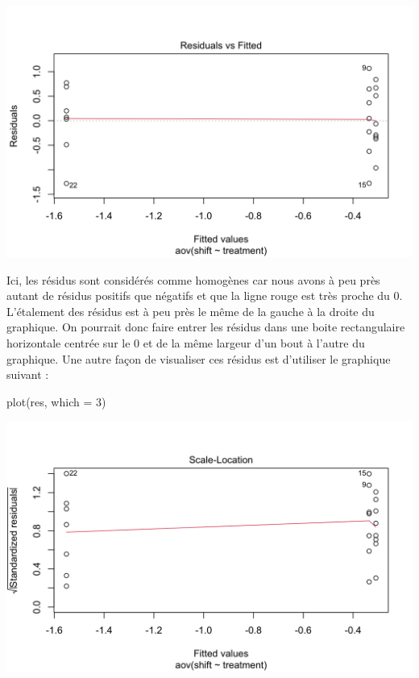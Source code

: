 \documentclass[
  a4paper,
]{article}
\newenvironment{Shaded}{\begin{snugshade}}{\end{snugshade}}
\newcommand{\AttributeTok}[1]{\textcolor[rgb]{0.00,0.34,0.68}{#1}}
\newcommand{\DecValTok}[1]{\textcolor[rgb]{0.69,0.50,0.00}{#1}}
\newcommand{\FunctionTok}[1]{\textcolor[rgb]{0.39,0.29,0.61}{#1}}
\newcommand{\NormalTok}[1]{\textcolor[rgb]{0.12,0.11,0.11}{#1}}
\begin{document}
\begin{center}\includegraphics[width=0.9\linewidth]{figure/unnamed-chunk-80-1} \end{center}

Ici, les résidus sont considérés comme homogènes car nous avons à peu près autant de résidus positifs que négatifs et que la ligne rouge est très proche du 0. L'étalement des résidus est à peu près le même de la gauche à la droite du graphique. On pourrait donc faire entrer les résidus dans une boite rectangulaire horizontale centrée sur le 0 et de la même largeur d'un bout à l'autre du graphique. Une autre façon de visualiser ces résidus est d'utiliser le graphique suivant :

\begin{Shaded}
\begin{Highlighting}[]
\FunctionTok{plot}\NormalTok{(res, }\AttributeTok{which =} \DecValTok{3}\NormalTok{)}
\end{Highlighting}
\end{Shaded}

\begin{center}\includegraphics[width=0.9\linewidth]{figure/unnamed-chunk-81-1} \end{center}
\end{document}
